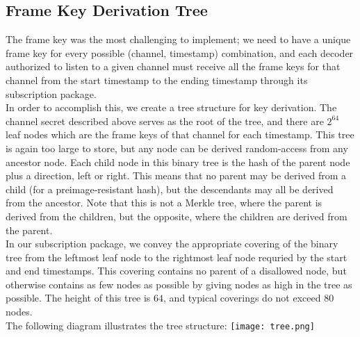 \documentclass[12pt]{article}
\begin{document}
\subsection*{Frame Key Derivation Tree}
The frame key was the most challenging to implement; we need to have a unique frame key for every possible (channel, timestamp) combination, and each decoder authorized to listen to a given channel must receive all the frame keys for that channel from the start timestamp to the ending timestamp through its subscription package.\\
In order to accomplish this, we create a tree structure for key derivation. The channel secret described above serves as the root of the tree, and there are $2^64$ leaf nodes which are the frame keys of that channel for each timestamp. This tree is again too large to store, but any node can be derived random-access from any ancestor node. Each child node in this binary tree is the hash of the parent node plus a direction, left or right. This means that no parent may be derived from a child (for a preimage-resistant hash), but the descendants may all be derived from the ancestor. Note that this is not a Merkle tree, where the parent is derived from the children, but the opposite, where the children are derived from the parent.\\
In our subscription package, we convey the appropriate covering of the binary tree from the leftmost leaf node to the rightmost leaf node requried by the start and end timestamps. This covering contains no parent of a disallowed node, but otherwise contains as few nodes as possible by giving nodes as high in the tree as possible. The height of this tree is $64$, and typical coverings do not exceed $80$ nodes.\\
The following diagram illustrates the tree structure:
\texttt{[image: tree.png]}
\end{document}
